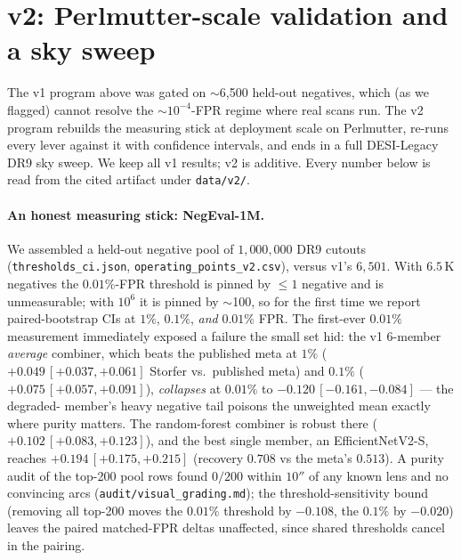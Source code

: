 \section{\cnet{} v2: Perlmutter-scale validation and a sky sweep}
\label{sec:v2}
The v1 program above was gated on $\sim$6{,}500 held-out negatives, which (as we
flagged) cannot resolve the $\sim$$10^{-4}$-FPR regime where real scans run. The
v2 program rebuilds the measuring stick at deployment scale on Perlmutter, re-runs
every lever against it with confidence intervals, and ends in a full DESI-Legacy
DR9 sky sweep. We keep all v1 results; v2 is additive. Every number below is read
from the cited artifact under \texttt{data/v2/}.

\paragraph{An honest measuring stick: NegEval-1M.} We assembled a held-out negative
pool of $1{,}000{,}000$ DR9 cutouts (\texttt{thresholds\_ci.json},
\texttt{operating\_points\_v2.csv}), versus v1's $6{,}501$. With $6.5$\,K negatives
the $0.01\%$-FPR threshold is pinned by $\le1$ negative and is unmeasurable; with
$10^{6}$ it is pinned by $\sim$100, so for the first time we report paired-bootstrap
CIs at $1\%$, $0.1\%$, \emph{and} $0.01\%$ FPR. The first-ever $0.01\%$ measurement
immediately exposed a failure the small set hid: the v1 6-member \emph{average}
combiner, which beats the published meta at $1\%$ ($+0.049\,[+0.037,+0.061]$
Storfer vs.\ published meta) and $0.1\%$ ($+0.075\,[+0.057,+0.091]$),
\emph{collapses} at $0.01\%$ to $-0.120\,[-0.161,-0.084]$ --- the degraded-\aion{}
member's heavy negative tail poisons the unweighted mean exactly where purity
matters. The random-forest combiner is robust there ($+0.102\,[+0.083,+0.123]$),
and the best single member, an EfficientNetV2-S, reaches $+0.194\,[+0.175,+0.215]$
(recovery $0.708$ vs the meta's $0.513$). A purity audit of the top-200 pool rows
found $0/200$ within $10''$ of any known lens and no convincing arcs
(\texttt{audit/visual\_grading.md}); the threshold-sensitivity bound (removing all
top-200 moves the $0.01\%$ threshold by $-0.108$, the $0.1\%$ by $-0.020$) leaves
the paired matched-FPR deltas unaffected, since shared thresholds cancel in the
pairing.

